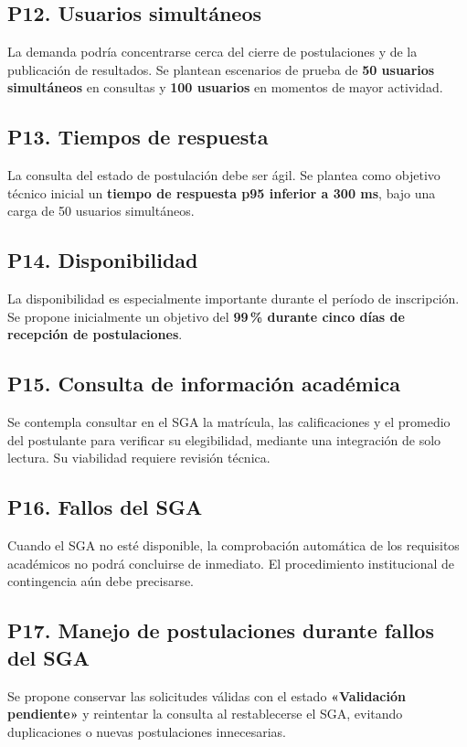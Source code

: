 \documentclass[12pt,a4paper]{article}
\begin{document}
\subsection{P12. Usuarios simultáneos}
La demanda podría concentrarse cerca del cierre de postulaciones y de la publicación de resultados. Se plantean escenarios de prueba de \textbf{50 usuarios simultáneos} en consultas y \textbf{100 usuarios} en momentos de mayor actividad.

\subsection{P13. Tiempos de respuesta}
La consulta del estado de postulación debe ser ágil. Se plantea como objetivo técnico inicial un \textbf{tiempo de respuesta p95 inferior a 300 ms}, bajo una carga de 50 usuarios simultáneos.

\subsection{P14. Disponibilidad}
La disponibilidad es especialmente importante durante el período de inscripción. Se propone inicialmente un objetivo del \textbf{99\,\% durante cinco días de recepción de postulaciones}.

\subsection{P15. Consulta de información académica}
Se contempla consultar en el SGA la matrícula, las calificaciones y el promedio del postulante para verificar su elegibilidad, mediante una integración de solo lectura. Su viabilidad requiere revisión técnica.

\subsection{P16. Fallos del SGA}
Cuando el SGA no esté disponible, la comprobación automática de los requisitos académicos no podrá concluirse de inmediato. El procedimiento institucional de contingencia aún debe precisarse.

\subsection{P17. Manejo de postulaciones durante fallos del SGA}
Se propone conservar las solicitudes válidas con el estado \textbf{«Validación pendiente»} y reintentar la consulta al restablecerse el SGA, evitando duplicaciones o nuevas postulaciones innecesarias.
\end{document}
